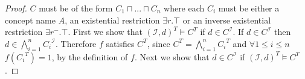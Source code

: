 \begin{proof}
$C$ must be of the form $C_1 \sqcap ... \sqcap C_n$ where each  $C_i$ must be either a concept name $A$, an existential restriction $\exists r.\top$ or an inverse existential restriction $\exists r^{-}.\top$. \newline
First we show that $(\mathcal{I}, d)^T \models C^T$ if $d\in C^\mathcal{I}$.
\newline
If $d \in C^{\mathcal{I}}$ then $d\in \bigwedge^{n}_{i=1}{C_{i}}^{\mathcal{I}}$. Therefore $f$ satisfies $C^T$, since $C^T = \bigwedge_{i = 1}^{n} {C_i}^T$ and $\forall 1 \leq i \leq n$ $f({C_i}^T) = 1$, by the definition of $f$.\newline
Next we show that $d\in C^\mathcal{I}$ if $(\mathcal{I}, d)^T \models C^T$.
\newline

\end{proof}
